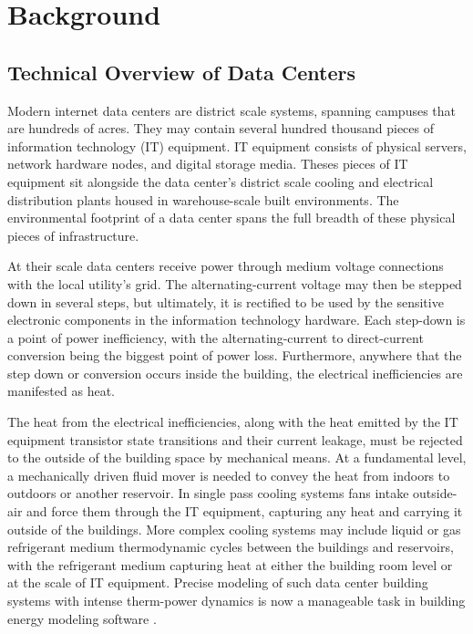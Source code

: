 \section{Background}
    \subsection{Technical Overview of Data Centers}
        Modern internet data centers are district scale systems, spanning campuses that are hundreds of acres. They may contain several hundred thousand pieces of information technology (IT) equipment. IT equipment consists of physical servers, network hardware nodes, and digital storage media. Theses pieces of IT equipment sit alongside the data center's district scale cooling and electrical distribution plants housed in warehouse-scale built environments. The environmental footprint of a data center spans the full breadth of these physical pieces of infrastructure. 

        At their scale data centers receive power through medium voltage connections with the local utility's grid. The alternating-current voltage may then be stepped down in several steps, but ultimately, it is rectified to be used by the sensitive electronic components in the information technology hardware. Each step-down is a point of power inefficiency, with the alternating-current to direct-current conversion being the biggest point of power loss. Furthermore, anywhere that the step down or conversion occurs inside the building, the electrical inefficiencies are manifested as heat.  

        The heat from the electrical inefficiencies, along with the heat emitted by the IT equipment transistor state transitions and their current leakage, must be rejected to the outside of the building space by mechanical means. At a fundamental level, a mechanically driven fluid mover is needed to convey the heat from indoors to outdoors or another reservoir. In single pass cooling systems fans intake outside-air and force them through the IT equipment, capturing any heat and carrying it outside of the buildings. More complex cooling systems may include liquid or gas refrigerant medium thermodynamic cycles between the buildings and reservoirs, with the refrigerant medium capturing heat at either the building room level or at the scale of IT equipment. Precise modeling of such data center building systems with intense therm-power dynamics is now a manageable task in building energy modeling software \cite{kumar20,kumar20b}. 

